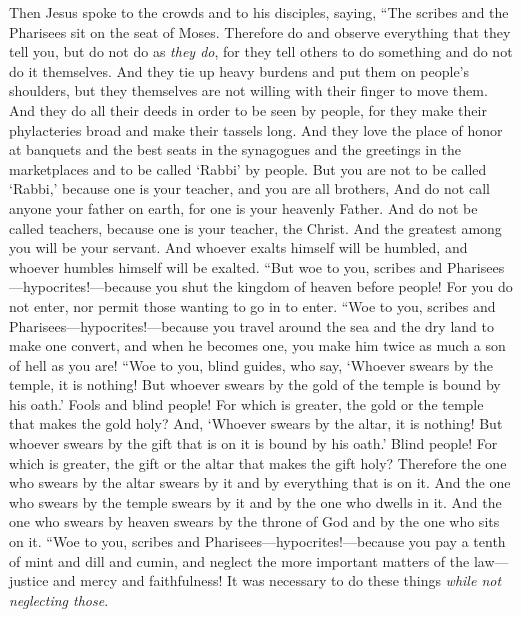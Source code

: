 \begin{biblechapter} %
 Then Jesus spoke to the crowds and to his disciples,
\verse saying, “The scribes and the Pharisees sit on the seat of Moses.
\verse Therefore do and observe everything that they tell you, but do not do as \textit{they do}, for they tell others to do something and do not do it themselves.
\verse And they tie up heavy burdens and put them on people’s shoulders, but they themselves are not willing with their finger to move them.
\verse And they do all their deeds in order to be seen by people, for they make their phylacteries broad and make their tassels long.
\verse And they love the place of honor at banquets and the best seats in the synagogues
\verse and the greetings in the marketplaces and to be called ‘Rabbi’ by people.
\verse But you are not to be called ‘Rabbi,’ because one is your teacher, and you are all brothers,
\verse And do not call anyone your father on earth, for one is your heavenly Father.
\verse And do not be called teachers, because one is your teacher, the Christ.
\verse And the greatest among you will be your servant.
\verse And whoever exalts himself will be humbled, and whoever humbles himself will be exalted.
\verse “But woe to you, scribes and Pharisees—hypocrites!—because you shut the kingdom of heaven before people! For you do not enter, nor permit those wanting to go in to enter.
\verse “Woe to you, scribes and Pharisees—hypocrites!—because you travel around the sea and the dry land to make one convert, and when he becomes one, you make him twice as much a son of hell as you are!
\verse “Woe to you, blind guides, who say, ‘Whoever swears by the temple, it is nothing! But whoever swears by the gold of the temple is bound by his oath.’
\verse Fools and blind people! For which is greater, the gold or the temple that makes the gold holy?
\verse And, ‘Whoever swears by the altar, it is nothing! But whoever swears by the gift that is on it is bound by his oath.’
\verse Blind people! For which is greater, the gift or the altar that makes the gift holy?
\verse Therefore the one who swears by the altar swears by it and by everything that is on it.
\verse And the one who swears by the temple swears by it and by the one who dwells in it.
\verse And the one who swears by heaven swears by the throne of God and by the one who sits on it.
\verse “Woe to you, scribes and Pharisees—hypocrites!—because you pay a tenth of mint and dill and cumin, and neglect the more important matters of the law—justice and mercy and faithfulness! It was necessary to do these things \textit{while not neglecting those}.

\end{biblechapter}
